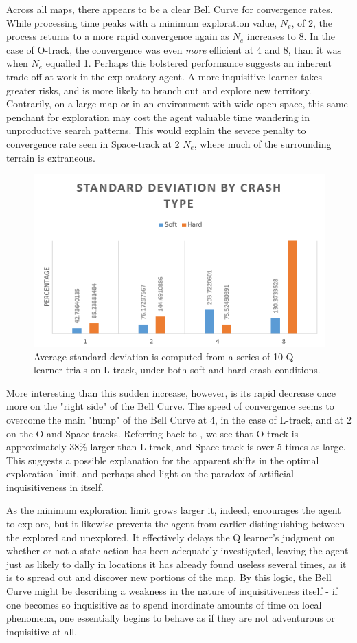 \documentclass[12pt, letter]{article}
\begin{document}
Across all maps, there appears to be a clear Bell Curve for convergence rates.  While processing time peaks with a minimum exploration value, $N_e$, of 2, the process returns to a more rapid convergence again as $N_e$ increases to 8. In the case of O-track, the convergence was even \emph{more} efficient at 4 and 8, than it was when $N_e$ equalled 1. Perhaps this bolstered performance suggests an inherent trade-off at work in the exploratory agent.  A more inquisitive learner takes greater risks, and is more likely to branch out and explore new territory.  Contrarily, on a large map or in an environment with wide open space, this same penchant for exploration may cost the agent valuable time wandering in unproductive search patterns.  This would explain the severe penalty to convergence rate seen in Space-track at 2 $N_e$, where much of the surrounding terrain is extraneous.

\begin{figure} 
    \centering
  \includegraphics[width=.6\textwidth]{img/softVhard/Q/StDevFlat}
  \caption{Average standard deviation is computed from a series of 10 Q learner trials on L-track, under both soft and hard crash conditions.}
  \label{fig:svhQStDevFlat}
\end{figure}

More interesting than this sudden increase, however, is its rapid decrease once more on the "right side" of the Bell Curve.  The speed of convergence seems to overcome the main "hump" of the Bell Curve at 4, in the case of L-track, and at 2 on the O and Space tracks.  Referring back to , we see that O-track is approximately $38\%$ larger than L-track, and Space track is over 5 times as large.  This suggests a possible explanation for the apparent shifts in the optimal exploration limit, and perhaps shed light on the paradox of artificial inquisitiveness in itself.

As the minimum exploration limit grows larger it, indeed, encourages the agent to explore, but it likewise prevents the agent from earlier distinguishing between the explored and unexplored.  It effectively delays the Q learner's judgment on whether or not a state-action has been adequately investigated, leaving the agent just as likely to dally in locations it has already found useless several times, as it is to spread out and discover new portions of the map.  By this logic, the Bell Curve might be describing a weakness in the nature of inquisitiveness itself - if one becomes so inquisitive as to spend inordinate amounts of time on local phenomena, one essentially begins to behave as if they are not adventurous or inquisitive at all.
\end{document}
